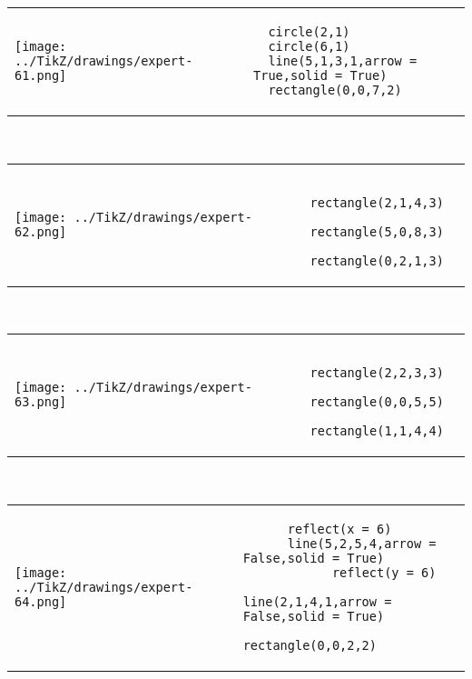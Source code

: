             \begin{tabular}{ll}
    \texttt{[image: ../TikZ/drawings/expert-61.png]}&
    
        \begin{minipage}{10cm}
        \begin{verbatim}
  circle(2,1)
  circle(6,1)
  line(5,1,3,1,arrow = True,solid = True)
  rectangle(0,0,7,2)
        \end{verbatim}
\end{minipage}

    \end{tabular}        
            \\

            \begin{tabular}{ll}
    \texttt{[image: ../TikZ/drawings/expert-62.png]}&
    
        \begin{minipage}{10cm}
        \begin{verbatim}
  rectangle(2,1,4,3)
  rectangle(5,0,8,3)
  rectangle(0,2,1,3)
        \end{verbatim}
\end{minipage}

    \end{tabular}        
            \\

            \begin{tabular}{ll}
    \texttt{[image: ../TikZ/drawings/expert-63.png]}&
    
        \begin{minipage}{10cm}
        \begin{verbatim}
  rectangle(2,2,3,3)
  rectangle(0,0,5,5)
  rectangle(1,1,4,4)
        \end{verbatim}
\end{minipage}

    \end{tabular}        
            \\

            \begin{tabular}{ll}
    \texttt{[image: ../TikZ/drawings/expert-64.png]}&
    
        \begin{minipage}{10cm}
        \begin{verbatim}
      reflect(x = 6)
      line(5,2,5,4,arrow = False,solid = True)
            reflect(y = 6)
            line(2,1,4,1,arrow = False,solid = True)
            rectangle(0,0,2,2)
        \end{verbatim}
\end{minipage}

    \end{tabular}        
            \\


